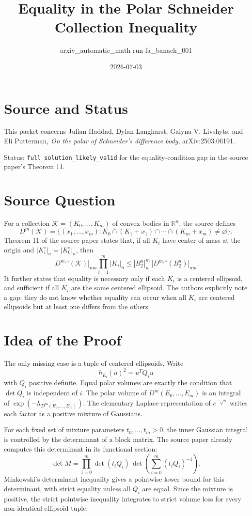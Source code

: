 \documentclass[11pt]{amsart}
\title{Equality in the Polar Schneider Collection Inequality}
\author{arxiv\_automatic\_math run fa\_banach\_001}
\date{2026-07-03}
\newcommand{\R}{\mathbb R}
\newcommand{\B}{B_2^n}
\newcommand{\voln}[1]{|#1|_n}
\newcommand{\volnm}[1]{|#1|_{nm}}
\begin{document}
\maketitle

\section*{Source and Status}

This packet concerns Julian Haddad, Dylan Langharst, Galyna V. Livshyts, and
Eli Putterman, \emph{On the polar of Schneider's difference body},
arXiv:2503.06191.

Status: \texttt{full\_solution\_likely\_valid} for the equality-condition gap
in the source paper's Theorem 11.

\section*{Source Question}

For a collection \(\mathcal K=(K_0,\ldots,K_m)\) of convex bodies in \(\R^n\),
the source defines
\[
  D^m(\mathcal K)
  =\{(x_1,\ldots,x_m):K_0\cap(K_1+x_1)\cap\cdots\cap(K_m+x_m)\neq\varnothing\}.
\]
Theorem 11 of the source paper states that, if all \(K_i\) have center of mass
at the origin and \(\voln{K_i^\circ}=\voln{K_0^\circ}\), then
\[
  \volnm{D^{m,\circ}(\mathcal K)}
  \prod_{i=1}^m\voln{K_i}
  \leq
  \voln{\B}^m\,\volnm{D^{m,\circ}(\B)}.
\]
It further states that equality is necessary only if each \(K_i\) is a centered
ellipsoid, and sufficient if all \(K_i\) are the same centered ellipsoid.  The
authors explicitly note a gap: they do not know whether equality can occur when
all \(K_i\) are centered ellipsoids but at least one differs from the others.

\section*{Idea of the Proof}

The only missing case is a tuple of centered ellipsoids.  Write
\[
  h_{E_i}(u)^2=u^TQ_i u
\]
with \(Q_i\) positive definite.  Equal polar volumes are exactly the condition
that \(\det Q_i\) is independent of \(i\).  The polar volume of
\(D^m(E_0,\ldots,E_m)\) is an integral of
\(\exp(-h_{D^m(E_0,\ldots,E_m)})\).  The elementary Laplace representation of
\(e^{-\sqrt{s}}\) writes each factor as a positive mixture of Gaussians.

For each fixed set of mixture parameters \(t_0,\ldots,t_m>0\), the inner
Gaussian integral is controlled by the determinant of a block matrix.  The
source paper already computes this determinant in its functional section:
\[
  \det M
  =
  \prod_{i=0}^m\det(t_iQ_i)\,
  \det\left(\sum_{i=0}^m(t_iQ_i)^{-1}\right).
\]
Minkowski's determinant inequality gives a pointwise lower bound for this
determinant, with strict equality unless all \(Q_i\) are equal.  Since the
mixture is positive, the strict pointwise inequality integrates to strict
volume loss for every non-identical ellipsoid tuple.
\end{document}
